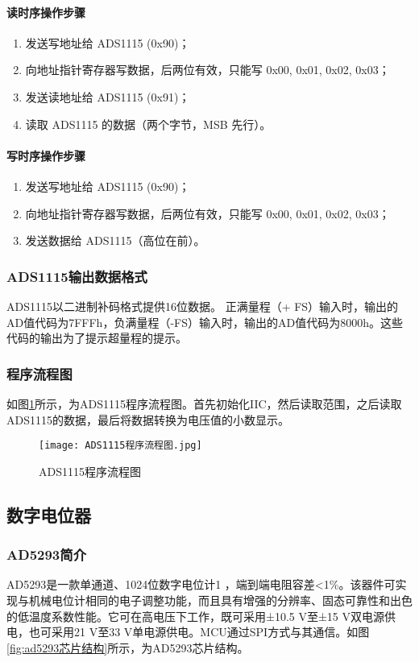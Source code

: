 \documentclass[lang=cn,11pt,a4paper]{elegantpaper}
\begin{document}
\paragraph{读时序操作步骤}
\begin{enumerate}
  \item 发送写地址给 ADS1115 (0x90)；
  \item 向地址指针寄存器写数据，后两位有效，只能写 0x00, 0x01, 0x02, 0x03；
  \item 发送读地址给 ADS1115 (0x91)；
  \item 读取 ADS1115 的数据（两个字节，MSB 先行）。
\end{enumerate}

\paragraph{写时序操作步骤}
\begin{enumerate}
  \item 发送写地址给 ADS1115 (0x90)；
  \item 向地址指针寄存器写数据，后两位有效，只能写 0x00, 0x01, 0x02, 0x03；
  \item 发送数据给 ADS1115（高位在前）。
\end{enumerate}

\subsubsection{ADS1115输出数据格式}
ADS1115以二进制补码格式提供16位数据。 正满量程（+ FS）输入时，输出的AD值代码为7FFFh，负满量程（-FS）输入时，输出的AD值代码为8000h。这些代码的输出为了提示超量程的提示。

\subsubsection{程序流程图}
如图\ref{fig:ADS1115程序流程图}所示，为ADS1115程序流程图。首先初始化IIC，然后读取范围，之后读取ADS1115的数据，最后将数据转换为电压值的小数显示。
\begin{figure}[!htb]
  \centering
  \texttt{[image: ADS1115程序流程图.jpg]}
  \caption{ADS1115程序流程图}
  \label{fig:ADS1115程序流程图}
\end{figure}

\subsection{数字电位器}
\subsubsection{AD5293简介}
AD5293是一款单通道、1024位数字电位计1 ，端到端电阻容差<1\%。该器件可实现与机械电位计相同的电子调整功能，而且具有增强的分辨率、固态可靠性和出色的低温度系数性能。它可在高电压下工作，既可采用±10.5 V至±15 V双电源供电，也可采用21 V至33 V单电源供电。MCU通过SPI方式与其通信。如图\ref{fig:ad5293芯片结构}所示，为AD5293芯片结构。
\end{document}
